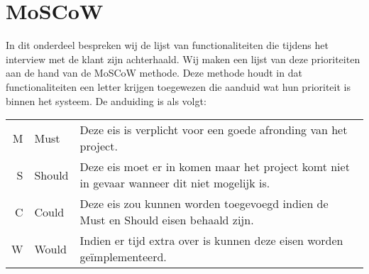 \chapter{MoSCoW}
In dit onderdeel bespreken wij de lijst van functionaliteiten die tijdens het interview met de klant zijn achterhaald.
Wij maken een lijst van deze prioriteiten aan de hand van de MoSCoW methode. Deze methode houdt in dat functionaliteiten een letter krijgen toegewezen die aanduid wat hun prioriteit is binnen het systeem.
De anduiding is als volgt: 

\begin{tabular}{ r  l p{9cm} }
M & Must & Deze eis is verplicht voor een goede afronding van het project. \\
S & Should & Deze eis moet er in komen maar het project komt niet in gevaar wanneer dit niet mogelijk is. \\
C & Could & Deze eis zou kunnen worden toegevoegd indien de Must en Should eisen behaald zijn. \\
W & Would & Indien er tijd extra over is kunnen deze eisen worden geïmplementeerd. \\
\end{tabular}

